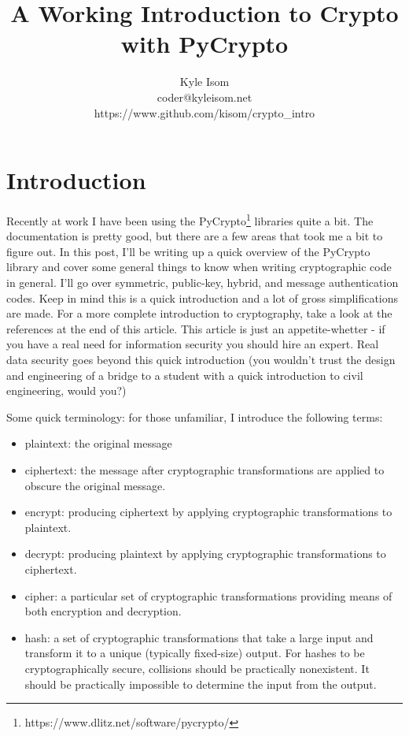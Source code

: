 \documentclass[letterpaper,10pt]{article}
\title{A Working Introduction to Crypto with PyCrypto}
\author{Kyle Isom\\coder@kyleisom.net\\https://www.github.com/kisom/crypto\_intro}
\begin{document}
\maketitle

\section{Introduction}
Recently at work I have been using the
PyCrypto\footnote{https://www.dlitz.net/software/pycrypto/} libraries quite
a bit. The documentation is pretty good, but there are a few areas
that took me a bit to figure out. In this post, I’ll be writing up
a quick overview of the PyCrypto library and cover some general
things to know when writing cryptographic code in general. I’ll go
over symmetric, public-key, hybrid, and message authentication
codes. Keep in mind this is a quick introduction and a lot of gross
simplifications are made. For a more complete introduction to
cryptography, take a look at the references at the end of this
article. This article is just an appetite-whetter - if you have a
real need for information security you should hire an expert. Real
data security goes beyond this quick introduction (you wouldn’t
trust the design and engineering of a bridge to a student with a
quick introduction to civil engineering, would you?)

Some quick terminology: for those unfamiliar, I introduce the following
terms:

\begin{itemize}

  \item plaintext: the original message

  \item ciphertext: the message after cryptographic transformations
  are applied to obscure the original message.

  \item encrypt: producing ciphertext by applying cryptographic
  transformations to plaintext.

  \item decrypt: producing plaintext by applying cryptographic
  transformations to ciphertext.

  \item cipher: a particular set of cryptographic transformations
  providing means of both encryption and decryption.

  \item hash: a set of cryptographic transformations that take a
  large input and transform it to a unique (typically fixed-size)
  output.  For hashes to be cryptographically secure, collisions
  should be practically nonexistent. It should be practically
  impossible to determine the input from the output.

\end{itemize}
\end{document}
